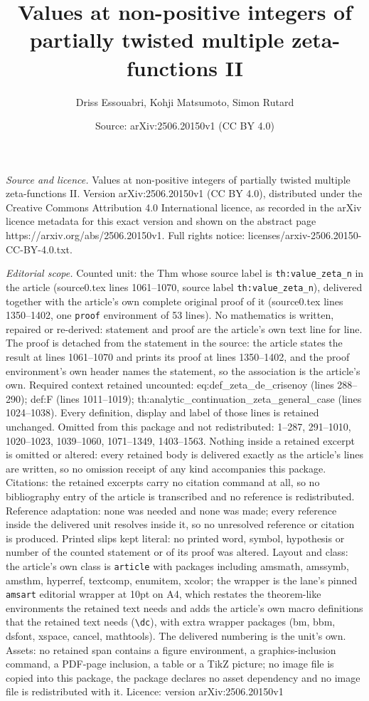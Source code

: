 \documentclass[10pt,a4paper]{amsart}
\title[Values at non-positive integers of partially twisted multipl]{Values at non-positive integers of partially twisted multiple zeta-functions II}
\author{Driss Essouabri, Kohji Matsumoto, Simon Rutard}
\date{Source: arXiv:2506.20150v1 (CC BY 4.0)}
\begin{document}
\maketitle

\noindent\emph{Source and licence.} Values at non-positive integers of partially twisted multiple zeta-functions II. Version arXiv:2506.20150v1 (CC BY 4.0), distributed under the Creative Commons Attribution 4.0 International licence, as recorded in the arXiv licence metadata for this exact version and shown on the abstract page https://arxiv.org/abs/2506.20150v1. Full rights notice: licenses/arxiv-2506.20150-CC-BY-4.0.txt.\par\smallskip

\noindent\textit{Editorial scope.} Counted unit: the Thm whose source label is \texttt{th:value\_zeta\_n} in the article (source0.tex lines 1061--1070, source label \texttt{th:value\_zeta\_n}), delivered together with the article's own complete original proof of it (source0.tex lines 1350--1402, one \texttt{proof} environment of 53 lines). No mathematics is written, repaired or re-derived: statement and proof are the article's own text line for line. The proof is detached from the statement in the source: the article states the result at lines 1061--1070 and prints its proof at lines 1350--1402, and the proof environment's own header names the statement, so the association is the article's own. Required context retained uncounted: eq:def\_zeta\_de\_crisenoy (lines 288--290); def:F (lines 1011--1019); th:analytic\_continuation\_zeta\_general\_case (lines 1024--1038). Every definition, display and label of those lines is retained unchanged. Omitted from this package and not redistributed: 1--287, 291--1010, 1020--1023, 1039--1060, 1071--1349, 1403--1563. Nothing inside a retained excerpt is omitted or altered: every retained body is delivered exactly as the article's lines are written, so no omission receipt of any kind accompanies this package. Citations: the retained excerpts carry no citation command at all, so no bibliography entry of the article is transcribed and no reference is redistributed. Reference adaptation: none was needed and none was made; every reference inside the delivered unit resolves inside it, so no unresolved reference or citation is produced. Printed slips kept literal: no printed word, symbol, hypothesis or number of the counted statement or of its proof was altered. Layout and class: the article's own class is \texttt{article} with packages including amsmath, amssymb, amsthm, hyperref, textcomp, enumitem, xcolor; the wrapper is the lane's pinned \texttt{amsart} editorial wrapper at 10pt on A4, which restates the theorem-like environments the retained text needs and adds the article's own macro definitions that the retained text needs (\texttt{\textbackslash dc}), with extra wrapper packages (bm, bbm, dsfont, xspace, cancel, mathtools). The delivered numbering is the unit's own. Assets: no retained span contains a figure environment, a graphics-inclusion command, a PDF-page inclusion, a table or a TikZ picture; no image file is copied into this package, the package declares no asset dependency and no image file is redistributed with it. Licence: version arXiv:2506.20150v1 
\end{document}
